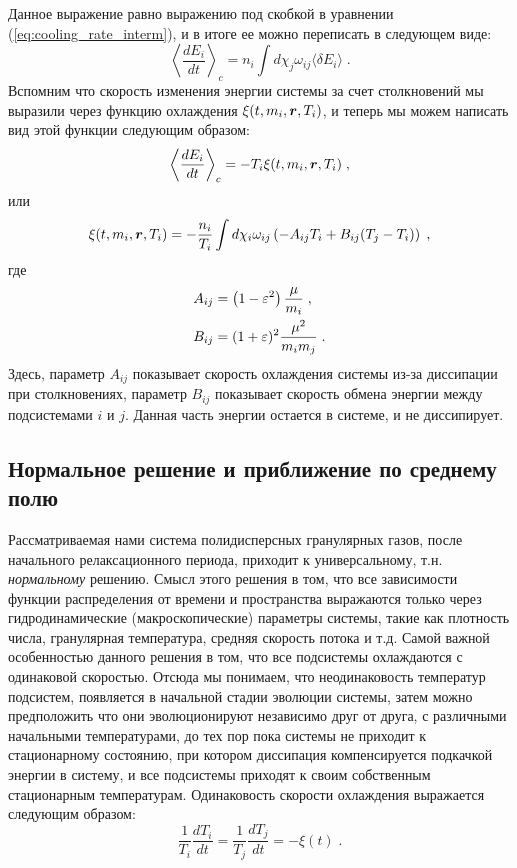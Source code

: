 Данное выражение равно выражению под скобкой в уравнении (\ref{eq:cooling_rate_interm}), и в итоге ее можно переписать в
следующем виде:
\begin{equation}
  \left\langle\frac{dE_i}{dt}\right\rangle_c = n_i\int d\chi_j\omega_{ij}\langle\delta E_i\rangle\;.
\end{equation} 
Вспомним что скорость изменения энергии системы за счет столкновений мы выразили через функцию охлаждения $\xi(t,m_i,\bm{r},T_i)$, 
и теперь мы можем написать вид этой функции следующим образом:
\begin{equation}
  \left\langle\frac{dE_i}{dt}\right\rangle_c = -T_i\xi(t,m_i,\bm{r},T_i)\;,
\end{equation} 
или
\begin{equation}\label{eq:cooling_term}
  \xi(t,m_i,\bm{r},T_i)=-\frac{n_i}{T_i}\int d\chi_i\omega_{ij}\left(-A_{ij}T_i+B_{ij}(T_j-T_i)\right)\;,
\end{equation}
где
\begin{equation}
  \begin{split}
    A_{ij} &= \left(1-\varepsilon^2\right)\frac{\mu}{m_i}\;,\\
    B_{ij} &= (1+\varepsilon)^2\frac{\mu^2}{m_im_j}\;.
  \end{split}
\end{equation}
Здесь, параметр $A_{ij}$ показывает скорость охлаждения системы из-за диссипации при столкновениях, 
параметр $B_{ij}$ показывает скорость обмена энергии между подсистемами $i$ и $j$. Данная часть энергии
остается в системе, и не диссипирует.

\subsection{Нормальное решение и приближение по среднему полю}
Рассматриваемая нами система полидисперсных гранулярных газов, после начального релаксационного периода, приходит 
к универсальному, т.н. \emph{нормальному} решению. Смысл этого решения в том, что все зависимости функции
распределения от времени и пространства выражаются только через гидродинамические (макроскопические) параметры системы, 
такие как плотность числа, гранулярная температура, средняя скорость потока и т.д. Самой важной особенностью данного решения
в том, что все подсистемы охлаждаются с одинаковой скоростью. Отсюда мы понимаем, что неодинаковость температур подсистем,
появляется в начальной стадии эволюции системы, затем можно предположить что они эволюционируют независимо друг от друга,
с различными начальными температурами, до тех пор пока системы не приходит к стационарному состоянию, при котором диссипация
компенсируется подкачкой энергии в систему, и все подсистемы приходят к своим собственным стационарным температурам.
Одинаковость скорости охлаждения выражается следующим образом:
\begin{equation}
  \frac{1}{T_i}\frac{dT_i}{dt}=\frac{1}{T_j}\frac{dT_j}{dt}=-\xi(t)\;.
\end{equation}

